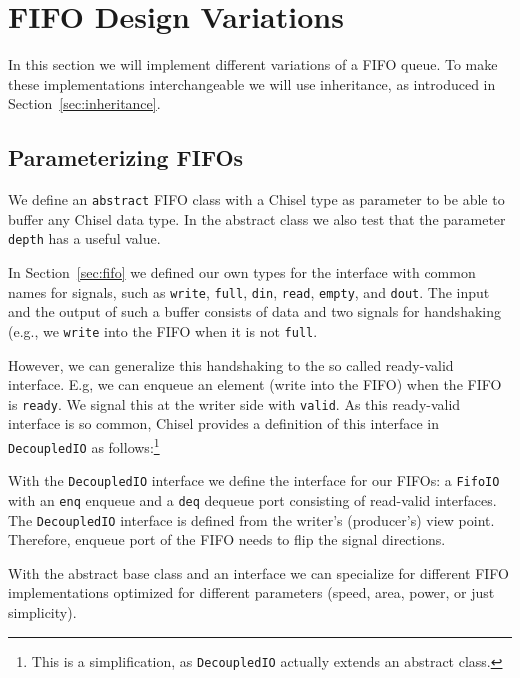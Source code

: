 \documentclass[%
    10pt,
    headinclude, footexclude,
    openright, %
    notitlepage,
    cleardoubleempty,
    headsepline,
    pointlessnumbers,
    bibtotoc, idxtotoc,
    ]{scrbook}
\newcommand{\code}[1]{{\small{\texttt{#1}}}}
\newcommand{\codefoot}[1]{{\footnotesize{\texttt{#1}}}}
\begin{document}
\section{FIFO Design Variations}
\label{sec:more:fifo}

In this section we will implement different variations of a FIFO queue.
To make these implementations interchangeable we will use inheritance,
as introduced in Section~\ref{sec:inheritance}.

\subsection{Parameterizing FIFOs}

We define an \code{abstract}
FIFO class with a Chisel type as parameter to be able to buffer
any Chisel data type. In the abstract class we also test that the
parameter \code{depth} has a useful value.


In Section~\ref{sec:fifo} we defined our own types for the interface with common
names for signals, such as \code{write}, \code{full}, \code{din}, \code{read},
\code{empty}, and \code{dout}. The input and the output of such a buffer consists
of data and two signals for handshaking (e.g., we \code{write} into the FIFO when
it is not \code{full}.

However, we can generalize this handshaking to the so called ready-valid interface.
E.g, we can enqueue an element (write into the FIFO) when the FIFO is \code{ready}.
We signal this at the writer side with \code{valid}.
As this ready-valid interface is so common, Chisel provides a definition
of this interface in \code{DecoupledIO} as follows:\footnote{This is a simplification,
as \codefoot{DecoupledIO} actually extends an abstract class.}


\noindent With the \code{DecoupledIO} interface we define the interface for our FIFOs:
a \code{FifoIO} with an \code{enq} enqueue and a \code{deq} dequeue port consisting
of read-valid interfaces.
 The \code{DecoupledIO} interface is defined from the writer's (producer's) view point.
Therefore, enqueue port of the FIFO needs to flip the signal directions.



With the abstract base class and an interface we can specialize for different
FIFO implementations optimized for different parameters (speed, area, power,
or just simplicity).
\end{document}

